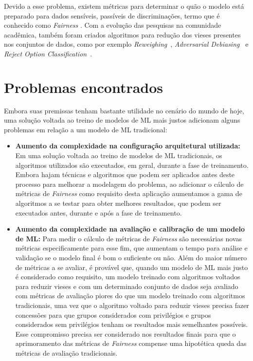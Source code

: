 \documentclass[portugues]{ic-tese}
\begin{document}
Devido a esse problema, existem métricas para determinar o quão o modelo está preparado para dados sensíveis, passíveis de discriminações, termo que é conhecido como \textit{Fairness} \citep{Begley_2021}. Com a evolução das pesquisas na comunidade acadêmica, também foram criados algoritmos para redução dos vieses presentes nos conjuntos de dados, como por exemplo \textit{Reweighing}~\citep{Kamiran_2011}, \textit{Adversarial Debiasing}~\citep{Zhang_2018} e \textit{Reject Option Classification}~\citep{Kamiran_2012}.

\section{Problemas encontrados}

Embora suas premissas tenham bastante utilidade no cenário do mundo de hoje, uma solução voltada ao treino de modelos de ML mais justos adicionam alguns problemas em relação a um modelo de ML tradicional:

\begin{itemize}
\item \textbf{Aumento da complexidade na configuração arquitetural utilizada:} Em uma solução voltada ao treino de modelos de ML tradicionais, os algoritmos utilizados são executados, em geral, durante a fase de treinamento. Embora hajam técnicas e algoritmos que podem ser aplicados antes deste processo para melhorar a modelagem do problema, ao adicionar o cálculo de métricas de \textit{Fairness} como requisito desta aplicação aumentamos a gama de algoritmos a se testar para obter melhores resultados, que podem ser executados antes, durante e após a fase de treinamento.
\item \textbf{Aumento da complexidade na avaliação e calibração de um modelo de ML:} Para medir o cálculo de métricas de \textit{Fairness} são necessárias novas métricas especificamente para esse fim, que aumentam o tempo para análise e validação se o modelo final é bom o suficiente ou não. Além do maior número de métricas a se avaliar, é provável que, quando um modelo de ML mais justo é considerado como requisito, um modelo treinado com algoritmos voltados para reduzir vieses e com um determinado conjunto de dados seja avaliado com métricas de avaliação piores do que um modelo treinado com algoritmos tradicionais, uma vez que o algoritmo voltado para reduzir vieses precisa fazer concessões para que grupos considerados com privilégios e grupos considerados sem privilégios tenham os resultados mais semelhantes possíveis. Esse compromisso precisa ser considerado nos resultados finais para que o aprimoramento das métricas de \textit{Fairness} compense uma hipotética queda das métricas de avaliação tradicionais.
\end{itemize}
\end{document}
